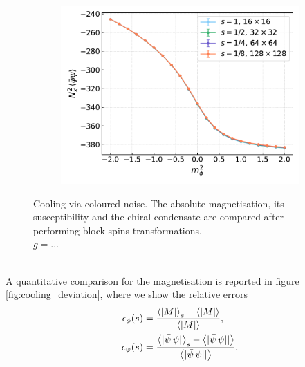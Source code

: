 \begin{figure}[hbp]
\begin{subfigure}[b]{0.48\textwidth}
        \includegraphics[width=1.05\textwidth]{figures/cooling/mass_scan/condensate.pdf}
    \end{subfigure}
    \caption[Cooling stochastic quantisation: fields as a function of the bosonic mass squared.]{Cooling via coloured noise. The absolute magnetisation, its susceptibility and the chiral condensate are compared after performing block-spins transformations. \\ $g = \dots$}
\end{figure}\\
A quantitative comparison for the magnetisation is reported in figure \ref{fig:cooling_deviation}, where we show the relative errors
\begin{equation}
    \begin{aligned}
        \epsilon_\phi(s) &= \frac{\left\langle |M| \right\rangle_{s} - \left\langle |M| \right\rangle}{\left\langle |M| \right\rangle}, \\
        \epsilon_\psi(s) &= \frac{\left\langle |\bar\psi \, \psi| \right\rangle_{s} - \left\langle |\bar\psi \, \psi|| \right\rangle}{\left\langle |\bar\psi \, \psi|| \right\rangle}.
    \end{aligned}
    \label{eq:cooling_relative_deviation}
\end{equation}
